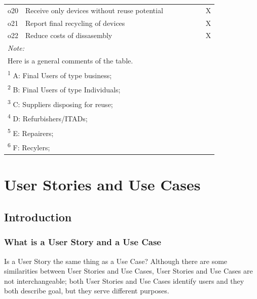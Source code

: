\documentclass[
]{book}
\begin{document}
\begin{table}
{\begin{tabular}[t]{llllllll}
o20 & Receive only devices without reuse potential &  &  &  &  &  & X\\
o21 & Report final recycling of devices &  &  &  &  &  & X\\
o22 & Reduce costs of dissasembly &  &  &  &  &  & X\\
\bottomrule
\multicolumn{8}{l}{\rule{0pt}{1em}\textit{Note: }}\\
\multicolumn{8}{l}{\rule{0pt}{1em}Here is a general comments of the table. }\\
\multicolumn{8}{l}{\rule{0pt}{1em}\textsuperscript{1} A: Final Users of type business; }\\
\multicolumn{8}{l}{\rule{0pt}{1em}\textsuperscript{2} B: Final Users of type Individuals; }\\
\multicolumn{8}{l}{\rule{0pt}{1em}\textsuperscript{3} C: Suppliers disposing for reuse; }\\
\multicolumn{8}{l}{\rule{0pt}{1em}\textsuperscript{4} D: Refurbishers/ITADs; }\\
\multicolumn{8}{l}{\rule{0pt}{1em}\textsuperscript{5} E: Repairers; }\\
\multicolumn{8}{l}{\rule{0pt}{1em}\textsuperscript{6} F: Recylers; }\\
\end{tabular}}
\end{table}

\hypertarget{user-stories-and-use-cases}{%
\chapter{User Stories and Use Cases}\label{user-stories-and-use-cases}}

\hypertarget{introduction-1}{%
\section{Introduction}\label{introduction-1}}

\hypertarget{what-is-a-user-story-and-a-use-case}{%
\subsection{What is a User Story and a Use Case}\label{what-is-a-user-story-and-a-use-case}}

Is a User Story the same thing as a Use Case? Although there are some similarities between User Stories and Use Cases, User Stories and Use Cases are not interchangeable; both User Stories and Use Cases identify users and they both describe goal, but they serve different purposes.
\end{document}
